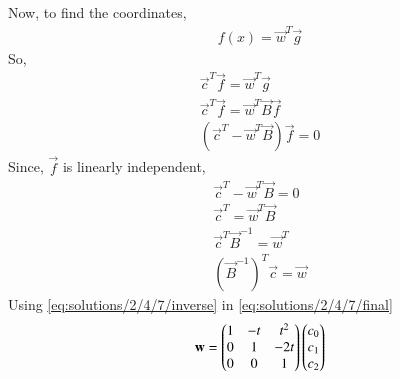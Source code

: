    Now, to find the coordinates,
  \begin{align}
  f(x)=\vec{w}^T\vec{g}
  \end{align}
  So,
  \begin{align}
  \vec{c}^T\vec{f}=\vec{w}^T\vec{g}\\
\vec{c}^T\vec{f}=\vec{w}^T\vec{B}\vec{f}\\
(\vec{c}^T-\vec{w}^T\vec{B})\vec{f}=0
  \end{align} 
  Since, $\vec{f}$ is linearly independent,
  \begin{align}
  \vec{c}^T-\vec{w}^T\vec{B}=0\\
  \vec{c}^T=\vec{w}^T\vec{B}\\
  \vec{c}^T\vec{B}^{-1}=\vec{w}^T\\
   (\vec{B}^{-1})^T\vec{c}=\vec{w}\label{eq:solutions/2/4/7/final}\end{align}
   Using \eqref{eq:solutions/2/4/7/inverse} in \eqref{eq:solutions/2/4/7/final}
   \begin{align}
 \mathbf{w}= \begin{pmatrix}1&-t&t^2\\0&1&-2t\\0&0&1\end{pmatrix}\begin{pmatrix}c_0\\c_1\\c_2\end{pmatrix}
  \end{align} 

